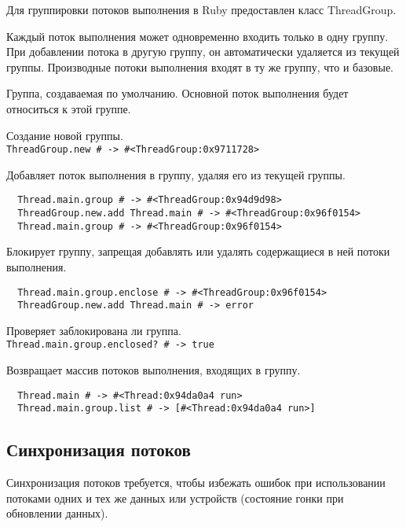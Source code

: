 Для группировки потоков выполнения в Ruby предоставлен класс ThreadGroup. 

Каждый поток выполнения может одновременно входить только в одну группу. При добавлении потока в другую группу, он автоматически удаляется из текущей группы. Производные потоки выполнения входят в ту же группу, что и базовые.

\begin{methodlist}
  Группа, создаваемая по умолчанию. Основной поток выполнения будет относиться к этой группе.

  Создание новой группы.
  \\\verb!ThreadGroup.new # -> #<ThreadGroup:0x9711728>!

  Добавляет поток выполнения в группу, удаляя его из текущей группы.
  \begin{verbatim}
  Thread.main.group # -> #<ThreadGroup:0x94d9d98>
  ThreadGroup.new.add Thread.main # -> #<ThreadGroup:0x96f0154>
  Thread.main.group # -> #<ThreadGroup:0x96f0154>
  \end{verbatim}

  Блокирует группу, запрещая добавлять или удалять содержащиеся в ней потоки выполнения.
  \begin{verbatim}
  Thread.main.group.enclose # -> #<ThreadGroup:0x96f0154>
  ThreadGroup.new.add Thread.main # -> error
  \end{verbatim}

  Проверяет заблокирована ли группа.
  \\\verb!Thread.main.group.enclosed? # -> true!

  Возвращает массив потоков выполнения, входящих в группу.
  \begin{verbatim}
  Thread.main # -> #<Thread:0x94da0a4 run>
  Thread.main.group.list # -> [#<Thread:0x94da0a4 run>]
  \end{verbatim}
\end{methodlist}

\subsection{Синхронизация потоков}

Синхронизация потоков требуется, чтобы избежать ошибок при использовании потоками одних и тех же данных или устройств (состояние гонки при обновлении данных).

